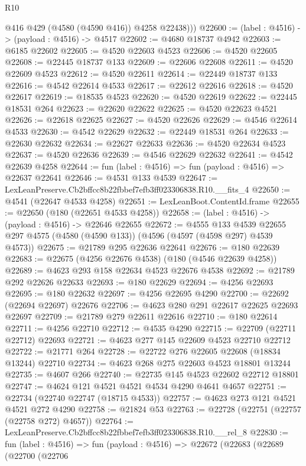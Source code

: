 \begin{lexlean}{R10}
\begin{coremodule}
          @416
          @429
          (@4580 (@4590 @416))
          @4258
          @22438)))
@22600 := (label : @4516) -> (payload : @4516) -> @4517
@22602 := @4680 @18737 @4942
@22603 := @6185 @22602
@22605 := @4520 @22603 @4523
@22606 := @4520 @22605
@22608 := @22445 @18737 @133
@22609 := @22606 @22608
@22611 := @4520 @22609 @4523
@22612 := @4520 @22611
@22614 := @22449 @18737 @133
@22616 := @4542 @22614 @4533
@22617 := @22612 @22616
@22618 := @4520 @22617
@22619 := @18535 @4523
@22620 := @4520 @22619
@22622 := @22445 @18531 @264
@22623 := @22620 @22622
@22625 := @4520 @22623 @4521
@22626 := @22618 @22625
@22627 := @4520 @22626
@22629 := @4546 @22614 @4533
@22630 := @4542 @22629
@22632 := @22449 @18531 @264
@22633 := @22630 @22632
@22634 := @22627 @22633
@22636 := @4520 @22634 @4523
@22637 := @4520 @22636
@22639 := @4546 @22629 @22632
@22641 := @4542 @22639 @4258
@22644 := fun (label : @4516) => fun (payload : @4516) => @22637 @22641
@22646 := @4531 @133 @4539
@22647 := LexLeanPreserve.Cb2bffcc8b22fbbef7efb3ff023306838.R10.__fits_4
@22650 := @4541 (@22647 @4533 @4258)
@22651 := LexLeanBoot.ContentId.frame
@22655 := @22650 (@180 (@22651 @4533 @4258))
@22658 := (label : @4516) -> (payload : @4516) -> @22646 @22655
@22672 := @4555
    @133
    @4539
    @22655
    @297
    @4575
    (@4580 (@4590 @133))
    (@4596 (@4597 (@4598 @297) @4539 @4573))
@22675 := @21789 @295 @22636 @22641
@22676 := @180 @22639
@22683 := @22675 (@4256 @22676 @4538) (@180 (@4546 @22639 @4258))
@22689 := @4623 @293 @158 @22634 @4523 @22676 @4538
@22692 := @21789 @292 @22626 @22633
@22693 := @180 @22629
@22694 := @4256 @22693
@22695 := @180 @22632
@22697 := @4256 @22695 @4290
@22700 := @22692 (@22694 @22697) @22676
@22706 := @4623 @280 @291 @22617 @22625 @22693 @22697
@22709 := @21789 @279 @22611 @22616
@22710 := @180 @22614
@22711 := @4256 @22710
@22712 := @4535 @4290
@22715 := @22709 (@22711 @22712) @22693
@22721 := @4623 @277 @145 @22609 @4523 @22710 @22712
@22722 := @21771 @264
@22728 := @22722 @276 @22605 @22608 (@18834 @13244) @22710
@22734 := @4623 @268 @275 @22603 @4523 @18801 @13244
@22735 := @4607 @266
@22740 := @22735 @145 @4523 @22602 @22712 @18801
@22747 := @4624 @121 @4521 @4521 @4534 @4290 @4641 @4657
@22751 := @22734 (@22740 @22747 (@18715 @4533))
@22757 := @4623 @273 @121 @4521 @4521 @272 @4290
@22758 := @21824 @53
@22763 := @22728 (@22751 (@22757 (@22758 @272) @4657))
@22764 := LexLeanPreserve.Cb2bffcc8b22fbbef7efb3ff023306838.R10.__rel_8
@22830 := fun (label : @4516) =>
  fun (payload : @4516) =>
  @22672
    (@22683
      (@22689
        (@22700
          (@22706

\end{coremodule}
\end{lexlean}
